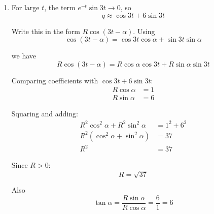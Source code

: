 \documentclass[leqno]{article}
\begin{document}
\begin{enumerate}[
  label=\textbf{\arabic*.},
  leftmargin=*,
  topsep=0pt,
  partopsep=0pt,
  parsep=0pt
]
\begin{djsSolution}
\begin{enumerate}[label=\textbf{(\alph*)}]
  Differentiate the general solution:
  \begin{align*}
  \frac{\mathrm{d}q}{\mathrm{d}t}
  &=\frac{\mathrm{d}}{\mathrm{d}t}\left[e^{-t}(A\cos 3t+B\sin 3t)\right]-3\sin 3t+18\cos 3t \\
  &=e^{-t}\left[(-A\cos 3t-B\sin 3t)+(-3A\sin 3t+3B\cos 3t)\right]-3\sin 3t+18\cos 3t \\
  &=e^{-t}\left[(3B-A)\cos 3t+(-3A-B)\sin 3t\right]-3\sin 3t+18\cos 3t
  \end{align*}

  When \(t=0\), \(\frac{\mathrm{d}q}{\mathrm{d}t}=15\):
  \begin{align*}
  15&=e^{0}\left[(3B-A)\cos 0+(-3A-B)\sin 0\right]-3\sin 0+18\cos 0 \\
  15&=3B-A+18
  \end{align*}

  Since \(A=0\):
  \begin{align*}
  15&=3B+18 \\
  3B&=-3 \\
  B&=-1
  \end{align*}

  So
  \[
  q=e^{-t}(0\times\cos 3t-\sin 3t)+\cos 3t+6\sin 3t
  \]

  Hence
  \[
  q=\cos 3t+6\sin 3t-e^{-t}\sin 3t
  \]

  \item For large \(t\), the term \(e^{-t}\sin 3t\to 0\), so
  \[
  q\approx \cos 3t+6\sin 3t
  \]

  Write this in the form \(R\cos(3t-\alpha)\). Using
  \[
  \cos(3t-\alpha)=\cos 3t\cos\alpha+\sin 3t\sin\alpha
  \]

  we have
  \[
  R\cos(3t-\alpha)=R\cos\alpha\cos 3t+R\sin\alpha\sin 3t
  \]

  Comparing coefficients with \(\cos 3t+6\sin 3t\):
  \begin{align*}
  R\cos\alpha&=1 \\
  R\sin\alpha&=6
  \end{align*}

  Squaring and adding:
  \begin{align*}
  R^2\cos^2\alpha+R^2\sin^2\alpha&=1^2+6^2 \\
  R^2(\cos^2\alpha+\sin^2\alpha)&=37 \\
  R^2&=37
  \end{align*}

  Since \(R>0\):
  \[
  R=\sqrt{37}
  \]

  Also
  \[
  \tan\alpha=\frac{R\sin\alpha}{R\cos\alpha}=\frac{6}{1}=6
  \]


\end{enumerate}
\end{djsSolution}
\end{enumerate}
\end{document}
